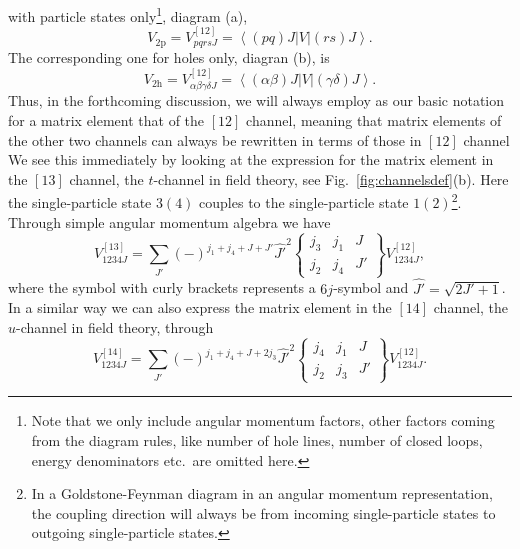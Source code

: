 \documentclass[twoside,12pt]{article}
\begin{document}
with particle states only\footnote{Note that we only
include angular momentum factors,
other
factors coming from the diagram rules\cite{kstop81},
like number of hole lines,
number of closed loops, energy denominators
etc.\ are omitted here.}, diagram (a),
\begin{equation}
      V_{\mathrm{2p}}=V_{pqrs J}^{[12]}=
       \left\langle (pq)J\right | V\left | (rs)J\right\rangle.
       \label{eq:2pv}
\end{equation}
The corresponding one for holes only, diagran (b), is
\begin{equation}
      V_{\mathrm{2h}}=V_{\alpha\beta\gamma\delta J}^{[12]}=
       \left\langle (\alpha\beta)J\right | V
       \left | (\gamma\delta)J\right\rangle.
       \label{eq:2hv}
\end{equation}
Thus, in the forthcoming discussion, we will always employ as our
basic notation for a matrix element that of the $[12]$ channel,
meaning that matrix elements of the other two channels
can always be rewritten in terms of those in $[12]$ channel
We see this immediately by looking at the expression for the
matrix element in the $[13]$ channel, the $t$-channel in field
theory, see Fig.\
\ref{fig:channelsdef}(b). Here the single-particle state $3(4)$
couples to the single-particle state $1(2)$\footnote{In a Goldstone-Feynman
diagram in an angular momentum representation, the coupling direction
will always be from incoming single-particle states to outgoing
single-particle states.}.
Through simple angular momentum algebra we have
\begin{equation}
      V_{1234J}^{[13]}=
      {\displaystyle \sum_{J'}}(-)^{j_1+j_4+J+J'}\hat{J'}^2
      \left\{
      \begin{array}{ccc}
       j_3&j_1&J\\j_2&j_4&J'
      \end{array}
       \right\}V_{1234J}^{[12]},
       \label{eq:13channel}
\end{equation}
where the symbol with curly brackets represents a $6j$-symbol and
$\hat{J'}=\sqrt{2J'+1}$.
In a similar way we can also express the matrix
element in the $[14]$ channel, the $u$-channel in field theory,
through
\begin{equation}
       V_{1234J}^{[14]}=
      {\displaystyle \sum_{J'}}(-)^{j_1+j_4+J+2j_3}\hat{J'}^2
      \left\{
      \begin{array}{ccc}
       j_4&j_1&J\\j_2&j_3&J'
      \end{array}
       \right\}
       V_{1234J}^{[12]}.
       \label{eq:14channel}
\end{equation}
\end{document}
